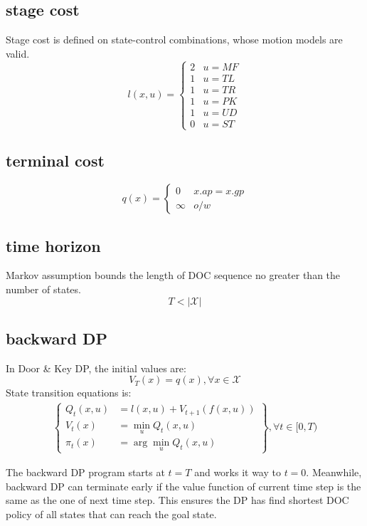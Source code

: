 \documentclass[conference]{IEEEtran}
\begin{document}
\subsection{stage cost}
\label{subsec:l}
Stage cost is defined on state-control combinations, whose motion models are valid.
$$
l(x ,u) = \begin{cases}2&u=MF\\ 1&u=TL\\ 1&u=TR\\ 1&u=PK\\ 1&u=UD\\ 0&u=ST\end{cases} 
$$
\subsection{terminal cost}

$$
q\left( x\right) = \begin{cases}0&x.ap=x.gp\\ \infty &o/w\end{cases} 
$$

\subsection{time horizon}
Markov assumption bounds the length of DOC sequence 
no greater than the number of states.
$$T < |\mathcal{X}|$$

\subsection{backward DP}
In Door \& Key DP, the initial values are:
$$V_T(x) = q(x), \forall x \in \mathcal{X}$$
State transition equations is:
$$
\begin{gathered}
    \left\{\begin{aligned}
        Q_t(x,u) &= l(x,u) + V_{t+1}(f(x,u)) \\
        V_t(x) &= \min_u Q_t(x,u) \\
        \pi_t(x) &= \arg\min_u Q_t(x,u)
    \end{aligned}\right\}, \forall t \in [0, T)
\end{gathered}
$$

The backward DP program starts at $t=T$ and works it way to $t=0$.
Meanwhile, backward DP can terminate early if the value function of current time step
is the same as the one of next time step. 
This ensures the DP has find shortest DOC policy of all states that can reach the goal state.
\end{document}
